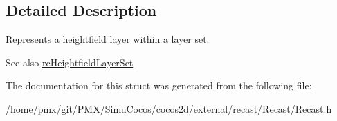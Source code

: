 \subsection{Detailed Description}
Represents a heightfield layer within a layer set. \begin{DoxySeeAlso}{See also}
\hyperlink{structrcHeightfieldLayerSet}{rc\+Heightfield\+Layer\+Set} 
\end{DoxySeeAlso}


The documentation for this struct was generated from the following file\+:\begin{DoxyCompactItemize}
\item 
/home/pmx/git/\+P\+M\+X/\+Simu\+Cocos/cocos2d/external/recast/\+Recast/Recast.\+h\end{DoxyCompactItemize}
